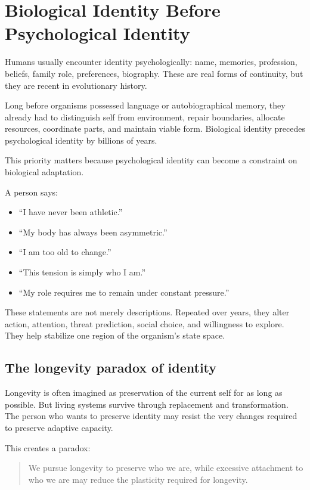 \chapter{Biological Identity Before Psychological Identity}

Humans usually encounter identity psychologically: name, memories, profession, beliefs, family role, preferences, biography. These are real forms of continuity, but they are recent in evolutionary history.

Long before organisms possessed language or autobiographical memory, they already had to distinguish self from environment, repair boundaries, allocate resources, coordinate parts, and maintain viable form. Biological identity precedes psychological identity by billions of years.

This priority matters because psychological identity can become a constraint on biological adaptation.

A person says:

\begin{itemize}
\tightlist
\item
  ``I have never been athletic.''
\item
  ``My body has always been asymmetric.''
\item
  ``I am too old to change.''
\item
  ``This tension is simply who I am.''
\item
  ``My role requires me to remain under constant pressure.''
\end{itemize}

These statements are not merely descriptions. Repeated over years, they alter action, attention, threat prediction, social choice, and willingness to explore. They help stabilize one region of the organism's state space.

\section{The longevity paradox of identity}

Longevity is often imagined as preservation of the current self for as long as possible. But living systems survive through replacement and transformation. The person who wants to preserve identity may resist the very changes required to preserve adaptive capacity.

This creates a paradox:

\begin{quote}
We pursue longevity to preserve who we are, while excessive attachment to who we are may reduce the plasticity required for longevity.
\end{quote}

